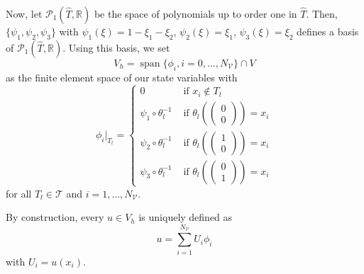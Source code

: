 Now, let $\mathcal{P}_1(\hat{T}, \mathbb{R})$ be the space of polynomials up to order one in $\hat{T}$. Then, $\{\psi_1, \psi_2, \psi_3\}$ with $\psi_1(\xi)=1-\xi_1-\xi_2$, $\psi_2(\xi)=\xi_1$, $\psi_3(\xi)=\xi_2$ defines a basis of $\mathcal{P}_1(\hat{T}, \mathbb{R})$.
Using this basis, we set
\begin{displaymath}
V_h=\operatorname*{span}\{\phi_i, i=0,\dotsc,N_\mathcal{V}\}\cap V
\end{displaymath}
as the finite element space of our state variables with
\begin{displaymath}
\phi_i|_{T_l}=\begin{cases}
0 & \text{ if $x_i\notin T_l$}\\
\psi_1 \circ \theta_l^{-1} & \text{ if $\theta_l\left(\begin{pmatrix} 0 \\ 0 \end{pmatrix}\right)=x_i$}\\
\psi_2 \circ \theta_l^{-1} & \text{ if $\theta_l\left(\begin{pmatrix} 1 \\ 0 \end{pmatrix}\right)=x_i$}\\
\psi_3 \circ \theta_l^{-1} & \text{ if $\theta_l\left(\begin{pmatrix} 0 \\ 1 \end{pmatrix}\right)=x_i$}
\end{cases} 
\end{displaymath}
for all $T_l\in\mathcal{T}$ and $i=1,\dotsc,N_\mathcal{V}$.

By construction, every $u\in V_h$ is uniquely defined as
\begin{equation}
\label{discretizedUSum}
u=\sum_{i=1}^{N_\mathcal{V}}U_i\phi_i
\end{equation}
with $U_i=u(x_i)$.\\

